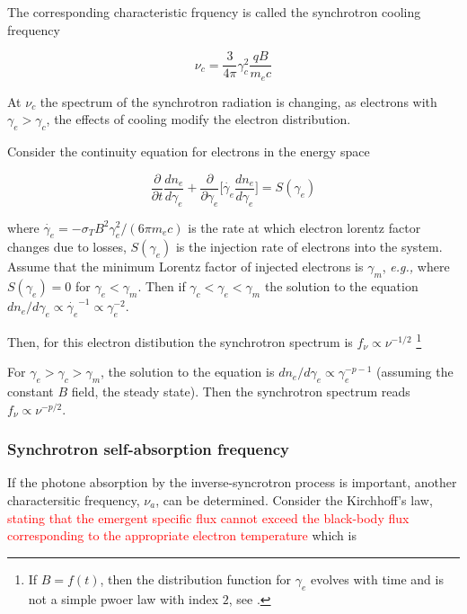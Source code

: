 \documentclass[11pt,a4paper,headinclude=true,DIV=14,BCOR=8mm,chapterprefix,listof=totoc,twoside,openright,abstracton]{scrbook}
\newcommand{\red}[1]{\textcolor{red}{#1}}
\begin{document}
The corresponding characteristic frquency is called the synchrotron cooling frequency

\begin{equation}
    \nu_c = \frac{3}{4\pi} \gamma_c^2 \frac{q B}{m_e c}
\end{equation}

At $\nu_c$ the spectrum of the synchrotron radiation is changing, as electrons with $\gamma_e > \gamma_c$, the effects of cooling modify the electron distribution. 

Consider the continuity equation for electrons in the energy space 

\begin{equation}
    \frac{\partial }{\partial t}\frac{d n_e}{d\gamma_e} + \frac{\partial}{\partial \gamma_e}\Big[ \dot{\gamma_e}\frac{dn_e}{d\gamma_e} \Big] = S(\gamma_e)
\end{equation}

where $\dot{\gamma_e} = -\sigma_T B^2 \gamma_e^2 / (6\pi m_e c)$ is the rate at which electron lorentz factor changes due to losses, $S(\gamma_e)$ is the injection rate of electrons into the system.
Assume that the minimum Lorentz factor of injected electrons is $\gamma_m$, \textit{e.g.,} where $S(\gamma_e) = 0$ for $\gamma_e < \gamma_m$.
Then if $\gamma_c < \gamma_e < \gamma_m$ the solution to the equation $dn_{e}/d\gamma_e \propto \dot{\gamma_e}^{-1} \propto \gamma_e^{-2}$.

Then, for this electron distibution the synchrotron spectrum is $f_{\nu}\propto\nu^{-1/2}$ 
\footnote{If $B=f(t)$, then the distribution function for $\gamma_e$ evolves with time and is not a simple pwoer law with index $2$, see \cite{Uhm and Zhang, 2014b}.}

For $\gamma_e > \gamma_c > \gamma_m$, the solution to the equation is $dn_e/d\gamma_e \propto \gamma_e^{-p-1}$ (assuming the constant $B$ field, the steady state). Then the synchrotron spectrum reads $f_{\nu}\propto\nu^{-p/2}$.


\subsubsection{Synchrotron self-absorption frequency}

If the photone absorption by the inverse-syncrotron process is important, another charactersitic frequency, $\nu_a$, can be determined. Consider the Kirchhoff's law, \red{stating that the emergent specific flux cannot exceed the black-body flux corresponding to the appropriate electron temperature} which is
\end{document}
